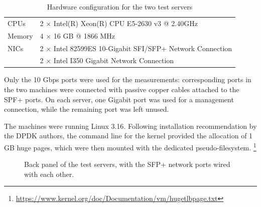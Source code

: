 \documentclass[11pt,a4paper,twoside,titlepage,openany]{book}
\begin{document}
\begin{table}[tb]
  \begin{center}
    \begin{tabular}{ll}
      \toprule
      CPUs   & 2 $\times$ Intel(R) Xeon(R) CPU E5-2630 v3 @ 2.40GHz \\
      Memory & 4 $\times$ 16 GB @ 1866 MHz\\
      NICs   & 2 $\times$ Intel 82599ES 10-Gigabit SFI/SFP+ Network Connection \\
             & 2 $\times$ Intel I350 Gigabit Network Connection \\
      \bottomrule
    \end{tabular}
  \end{center}
  \caption{Hardware configuration for the two test servers}
  \label{tab:test.hw}
\end{table}

Only the 10 Gbps ports were used for the measurements: corresponding ports in the two machines were connected with passive copper cables attached to the SPF+ ports. On each server, one Gigabit port was used for a management connection, while the remaining port was left unused.

The machines were running Linux 3.16. Following installation recommendation by the DPDK authors, the command line for the kernel provided the allocation of 1 GB huge pages, which were then mounted with the dedicated pseudo-filesystem.%
\footnote{\url{https://www.kernel.org/doc/Documentation/vm/hugetlbpage.txt}}

\begin{figure}[tb]
  \begin{center}
    \caption[Back panel of the test servers]{Back panel of the test servers, with the SFP+ network ports wired with each other.}
    \label{fig:test.servers_backpane}
  \end{center}
\end{figure}
\end{document}
